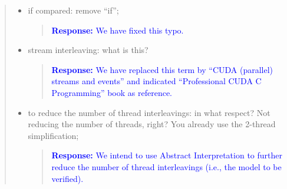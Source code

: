 \documentclass[11pt]{article}
\begin{document}
\begin{quote}
\begin{itemize}
\begin{itemize}
  \item if compared: remove ``if'';
  
    \begin{quote}
    \textcolor{blue}{\textbf{Response:} We have fixed this typo.}
    \end{quote}

  \item stream interleaving: what is this?
  
    \begin{quote}
    \textcolor{blue}{\textbf{Response:} We have replaced this term by ``CUDA (parallel) streams and events'' and indicated ``Professional CUDA C Programming'' book as reference.}
    \end{quote}

  \item  to reduce the number of thread interleavings: in what respect? Not reducing the number of threads, right? You already use the 2-thread simplification;
  
    \begin{quote}
    \textcolor{blue}{\textbf{Response:} We intend to use Abstract Interpretation to further reduce the number of thread interleavings (i.e., the model to be verified).}
    \end{quote}

  \end{itemize}
\end{itemize}

\end{quote}

\label{LastPage}

\end{document}
